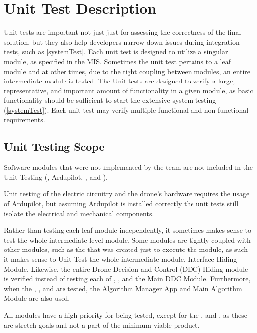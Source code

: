 \documentclass[12pt, titlepage]{article}
\begin{document}
\clearpage

\section{Unit Test Description}
\label{unitTest}

Unit tests are important not just just for assessing the correctness of the final solution, but they also help developers narrow down issues during integration tests, such as \ref{systemTest}. Each unit test is designed to utilize a singular module, as specified in the MIS. Sometimes the unit test pertains to a leaf module and at other times, due to the tight coupling between modules, an entire intermediate module is tested. The Unit tests are designed to verify a large, representative, and important amount of functionality in a given module, as basic functionality should be sufficient to start the extensive system testing (\ref{systemTest}). Each unit test may verify multiple functional and non-functional requirements.

\subsection{Unit Testing Scope}

Software modules that were not implemented by the team are not included in the Unit Testing (, Ardupilot, , and ). 
 


Unit testing of the electric circuitry and the drone's hardware requires the usage of Ardupilot, but assuming Ardupilot is installed correctly the unit tests still isolate the electrical and mechanical components.


Rather than testing each leaf module independently, it sometimes makes sense to test the whole intermediate-level module. Some modules are tightly coupled with other modules, such as the  that was created just to execute the  module, as such it makes sense to Unit Test the whole intermediate module, Interface Hiding Module. Likewise, the entire Drone Decision and Control (DDC) Hiding module is verified instead of testing each of , , and the Main DDC Module. Furthermore, when the , , and  are tested, the Algorithm Manager App and Main Algorithm Module are also used. 

All modules have a high priority for being tested, except for the , and , as these are stretch goals and not a part of the minimum viable product.
\end{document}
